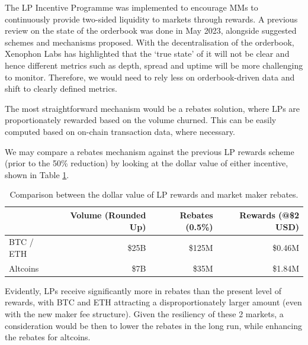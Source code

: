             \begin{displayquote}
                The LP Incentive Programme was implemented to encourage MMs to continuously provide two-sided liquidity to markets through rewards. A previous review on the state of the orderbook was done in May 2023, alongside suggested schemes and mechanisms proposed. With the decentralisation of the orderbook, Xenophon Labs has highlighted that the ‘true state’ of it will not be clear and hence different metrics such as depth, spread and uptime will be more challenging to monitor. Therefore, we would need to rely less on orderbook-driven data and shift to clearly defined metrics.

                The most straightforward mechanism would be a rebates solution, where LPs are proportionately rewarded based on the volume churned. This can be easily computed based on on-chain transaction data, where necessary. 

                We may compare a rebates mechanism against the previous LP rewards scheme (prior to the 50\% reduction) by looking at the dollar value of either incentive, shown in Table \ref{tab:lp_rewards_vs_rebates}.

                \begin{table}[htp]
                    \centering
                    \begin{tabular}{l r r r}
                        \toprule
                        & Volume (Rounded Up)	& Rebates (0.5\%) & Rewards (@\$2 USD) \\
                        \midrule
                        BTC / ETH & \$25B & \$125M & \$0.46M \\
                        Altcoins & \$7B	& \$35M	& \$1.84M \\
                        \bottomrule
                    \end{tabular}
                    \caption{Comparison between the dollar value of LP rewards and market maker rebates.}
                    \label{tab:lp_rewards_vs_rebates}
                \end{table}

                Evidently, LPs receive significantly more in rebates than the present level of rewards, with BTC and ETH attracting a disproportionately larger amount (even with the new maker fee structure). Given the resiliency of these 2 markets, a consideration would be then to lower the rebates in the long run, while enhancing the rebates for altcoins. 
            \end{displayquote}

